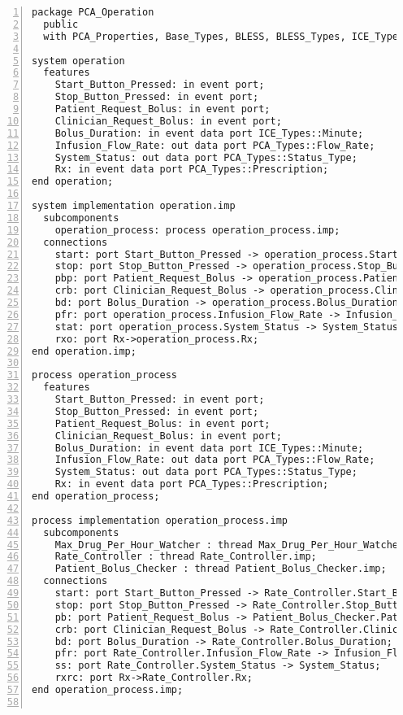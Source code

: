\singlespacing
\begin{lstlisting}[language=aadl, gobble=0, numbers=left, caption={\lstinline{PCA_Operation} package}]
package PCA_Operation
  public
  with PCA_Properties, Base_Types, BLESS, BLESS_Types, ICE_Types, PCA_Types;

system operation
  features
    Start_Button_Pressed: in event port;
    Stop_Button_Pressed: in event port;  
    Patient_Request_Bolus: in event port;
    Clinician_Request_Bolus: in event port; 
    Bolus_Duration: in event data port ICE_Types::Minute;
    Infusion_Flow_Rate: out data port PCA_Types::Flow_Rate;
    System_Status: out data port PCA_Types::Status_Type;
    Rx: in event data port PCA_Types::Prescription;
end operation;

system implementation operation.imp
  subcomponents
    operation_process: process operation_process.imp;
  connections
  	start: port Start_Button_Pressed -> operation_process.Start_Button_Pressed;
    stop: port Stop_Button_Pressed -> operation_process.Stop_Button_Pressed;
  	pbp: port Patient_Request_Bolus -> operation_process.Patient_Request_Bolus;
  	crb: port Clinician_Request_Bolus -> operation_process.Clinician_Request_Bolus;
  	bd: port Bolus_Duration -> operation_process.Bolus_Duration;
  	pfr: port operation_process.Infusion_Flow_Rate -> Infusion_Flow_Rate;
    stat: port operation_process.System_Status -> System_Status;
    rxo: port Rx->operation_process.Rx;
end operation.imp;

process operation_process
  features
  	Start_Button_Pressed: in event port;
    Stop_Button_Pressed: in event port;  
    Patient_Request_Bolus: in event port;
    Clinician_Request_Bolus: in event port; 
    Bolus_Duration: in event data port ICE_Types::Minute;
    Infusion_Flow_Rate: out data port PCA_Types::Flow_Rate;
    System_Status: out data port PCA_Types::Status_Type;
    Rx: in event data port PCA_Types::Prescription; 
end operation_process;

process implementation operation_process.imp
  subcomponents
    Max_Drug_Per_Hour_Watcher : thread Max_Drug_Per_Hour_Watcher.imp;
    Rate_Controller : thread Rate_Controller.imp;
    Patient_Bolus_Checker : thread Patient_Bolus_Checker.imp;
  connections
  	start: port Start_Button_Pressed -> Rate_Controller.Start_Button_Pressed;
    stop: port Stop_Button_Pressed -> Rate_Controller.Stop_Button_Pressed;
    pb: port Patient_Request_Bolus -> Patient_Bolus_Checker.Patient_Request_Bolus;
    crb: port Clinician_Request_Bolus -> Rate_Controller.Clinician_Request_Bolus;
    bd: port Bolus_Duration -> Rate_Controller.Bolus_Duration;
    pfr: port Rate_Controller.Infusion_Flow_Rate -> Infusion_Flow_Rate;
    ss: port Rate_Controller.System_Status -> System_Status;
    rxrc: port Rx->Rate_Controller.Rx;       
end operation_process.imp;


\end{lstlisting}
